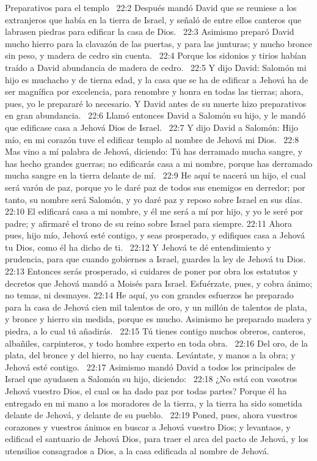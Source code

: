 Preparativos para el templo  
22:2 Después mandó David que se reuniese a los extranjeros que había en la tierra de Israel, y señaló de entre ellos canteros que labrasen piedras para edificar la casa de Dios.  
22:3 Asimismo preparó David mucho hierro para la clavazón de las puertas, y para las junturas; y mucho bronce sin peso, y madera de cedro sin cuenta.  
22:4 Porque los sidonios y tirios habían traído a David abundancia de madera de cedro.  
22:5 Y dijo David: Salomón mi hijo es muchacho y de tierna edad, y la casa que se ha de edificar a Jehová ha de ser magnífica por excelencia, para renombre y honra en todas las tierras; ahora, pues, yo le prepararé lo necesario. Y David antes de su muerte hizo preparativos en gran abundancia.  
22:6 Llamó entonces David a Salomón su hijo, y le mandó que edificase casa a Jehová Dios de Israel.  
22:7 Y dijo David a Salomón: Hijo mío, en mi corazón tuve el edificar templo al nombre de Jehová mi Dios.  
22:8 Mas vino a mí palabra de Jehová, diciendo: Tú has derramado mucha sangre, y has hecho grandes guerras; no edificarás casa a mi nombre, porque has derramado mucha sangre en la tierra delante de mí.  
22:9 He aquí te nacerá un hijo, el cual será varón de paz, porque yo le daré paz de todos sus enemigos en derredor; por tanto, su nombre será Salomón, y yo daré paz y reposo sobre Israel en sus días.  
22:10 El edificará casa a mi nombre, y él me será a mí por hijo, y yo le seré por padre; y afirmaré el trono de su reino sobre Israel para siempre. 
22:11 Ahora pues, hijo mío, Jehová esté contigo, y seas prosperado, y edifiques casa a Jehová tu Dios, como él ha dicho de ti.  
22:12 Y Jehová te dé entendimiento y prudencia, para que cuando gobiernes a Israel, guardes la ley de Jehová tu Dios.  
22:13 Entonces serás prosperado, si cuidares de poner por obra los estatutos y decretos que Jehová mandó a Moisés para Israel. Esfuérzate, pues, y cobra ánimo; no temas, ni desmayes. 
22:14 He aquí, yo con grandes esfuerzos he preparado para la casa de Jehová cien mil talentos de oro, y un millón de talentos de plata, y bronce y hierro sin medida, porque es mucho. Asimismo he preparado madera y piedra, a lo cual tú añadirás.  
22:15 Tú tienes contigo muchos obreros, canteros, albañiles, carpinteros, y todo hombre experto en toda obra.  
22:16 Del oro, de la plata, del bronce y del hierro, no hay cuenta. Levántate, y manos a la obra; y Jehová esté contigo.  
22:17 Asimismo mandó David a todos los principales de Israel que ayudasen a Salomón su hijo, diciendo:  
22:18 ¿No está con vosotros Jehová vuestro Dios, el cual os ha dado paz por todas partes? Porque él ha entregado en mi mano a los moradores de la tierra, y la tierra ha sido sometida delante de Jehová, y delante de su pueblo.  
22:19 Poned, pues, ahora vuestros corazones y vuestros ánimos en buscar a Jehová vuestro Dios; y levantaos, y edificad el santuario de Jehová Dios, para traer el arca del pacto de Jehová, y los utensilios consagrados a Dios, a la casa edificada al nombre de Jehová.  
